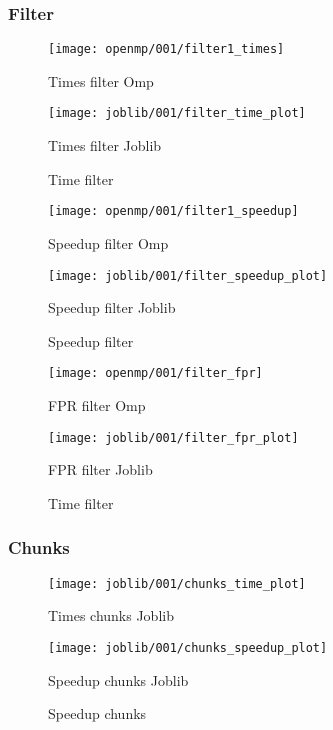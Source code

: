 \subsubsection{Filter}\label{subsubsec:filter}
\begin{figure}[H]
    \centering
    \texttt{[image: openmp/001/filter1\_times]}
        \caption{Times filter Omp}\label{fig:filter_time_omp}
    \endminipage\hfill
    \texttt{[image: joblib/001/filter\_time\_plot]}
        \caption{Times filter Joblib}\label{fig:filter_time_joblib}
    \endminipage\hfill
    \caption{Time filter}
\end{figure}
\begin{figure}[H]
    \centering
    \texttt{[image: openmp/001/filter1\_speedup]}
        \caption{Speedup filter Omp}\label{fig:filter_speedup_omp}
    \endminipage\hfill
    \texttt{[image: joblib/001/filter\_speedup\_plot]}
        \caption{Speedup filter Joblib}\label{fig:filter_speedup_joblib}
    \endminipage\hfill
    \caption{Speedup filter}
\end{figure}
\begin{figure}[H]
    \centering
    \texttt{[image: openmp/001/filter\_fpr]}
        \caption{FPR filter Omp}\label{fig:filter_fpr_omp}
    \endminipage\hfill
    \texttt{[image: joblib/001/filter\_fpr\_plot]}
        \caption{FPR filter Joblib}\label{fig:filter_fpr_joblib}
    \endminipage\hfill
    \caption{Time filter}
\end{figure}

\subsubsection{Chunks}\label{subsubsec:chunks}
\begin{figure}[H]
    \centering
    \texttt{[image: joblib/001/chunks\_time\_plot]}
        \caption{Times chunks Joblib}\label{fig:chunks_time_joblib}
    \endminipage\hfill
    \texttt{[image: joblib/001/chunks\_speedup\_plot]}
        \caption{Speedup chunks Joblib}\label{fig:chunks_speedup_joblib}
    \endminipage\hfill
    \caption{Speedup chunks}
\end{figure}